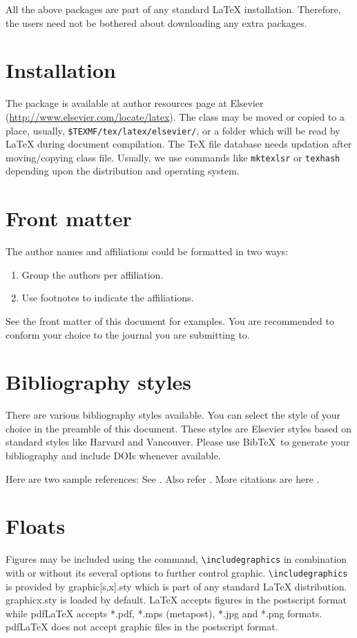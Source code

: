 \documentclass[a4paper,fleqn]{cas-sc}
\begin{document}
All the above packages are part of any
standard \LaTeX{} installation.
Therefore, the users need not be
bothered about downloading any extra packages.

\section{Installation}

The package is available at author resources page at Elsevier
(\url{http://www.elsevier.com/locate/latex}).
The class may be moved or copied to a place, usually,
\verb+$TEXMF/tex/latex/elsevier/+, %
or a folder which will be read                   
by \LaTeX{} during document compilation.  The \TeX{} file
database needs updation after moving/copying class file.  Usually,
we use commands like \verb+mktexlsr+ or \verb+texhash+ depending
upon the distribution and operating system.

\section{Front matter}

The author names and affiliations could be formatted in two ways:
\begin{enumerate}[(1)]
\item Group the authors per affiliation.
\item Use footnotes to indicate the affiliations.
\end{enumerate}
See the front matter of this document for examples. 
You are recommended to conform your choice to the journal you 
are submitting to.

\section{Bibliography styles}

There are various bibliography styles available. You can select the
style of your choice in the preamble of this document. These styles are
Elsevier styles based on standard styles like Harvard and Vancouver.
Please use Bib\TeX\ to generate your bibliography and include DOIs
whenever available.

Here are two sample references: 
See \citet{Fortunato2010}. Also refer \citet{Fortunato2010,NewmanGirvan2004}.
More citations are here \citep{Fortunato2010,Vehlowetal2013}.

\section{Floats}
{Figures} may be included using the command, \verb+\includegraphics+ in
combination with or without its several options to further control
graphic. \verb+\includegraphics+ is provided by {graphic[s,x].sty}
which is part of any standard \LaTeX{} distribution.
{graphicx.sty} is loaded by default. \LaTeX{} accepts figures in
the postscript format while pdf\LaTeX{} accepts {*.pdf},
{*.mps} (metapost), {*.jpg} and {*.png} formats. 
pdf\LaTeX{} does not accept graphic files in the postscript format. 
\end{document}
